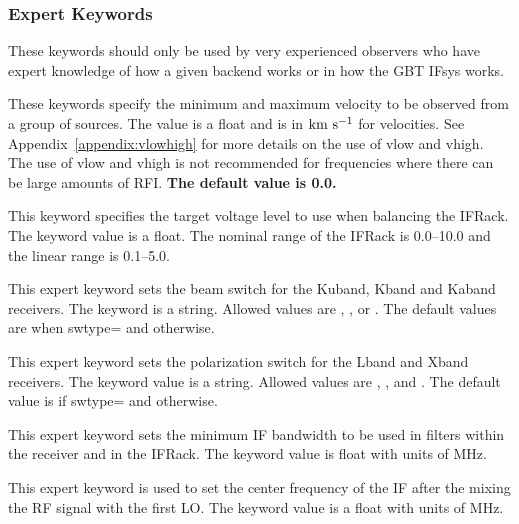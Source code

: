 \subsubsection{Expert Keywords}

These keywords should only be used by very experienced observers who
have expert knowledge of how a given backend works or in how the \gls{GBT}
\gls{IFsys} works.

\begin{description}[font=\bfseries\large,leftmargin=*]

\item[vlow \textnormal{and} vhigh] These keywords specify the minimum
and maximum velocity to be observed from a group of sources.  The value is a
float and is in ${\rm km~s^{-1}}$ for velocities. See
Appendix~\ref{appendix:vlowhigh} for more details on the use of vlow and
vhigh.  The use of vlow and vhigh is not recommended for frequencies where
there can be large amounts of \gls{RFI}. {\bf The default value is 0.0.}

\item[iftarget] This keyword specifies the target voltage level to use
when balancing the \gls{IFRack}.  The keyword value is a float.  The nominal
range of the \gls{IFRack} is 0.0--10.0 and the linear range is 0.1--5.0.


\item[xfer] This expert keyword sets the beam switch for the 
\gls{Kuband}, \gls{Kband} and \gls{Kaband} receivers.  The keyword is a string.
Allowed values are , , or .  The default values are
 when swtype= and  otherwise.

\item[polswitch]  This expert keyword sets the polarization switch
for the \gls{Lband} and \gls{Xband} receivers.  The keyword value is a string.
Allowed values are , , and .  The default value is
 if swtype= and  otherwise.

\item[ifbw] This expert keyword sets the minimum \gls{IF} bandwidth to be
used in filters within the receiver and in the \gls{IFRack}.  The keyword value
is float with units of MHz.

\item[if0freq] This expert keyword is used to set the center frequency
of the \gls{IF} after the mixing the \gls{RF} signal with the first
\gls{LO}.  The keyword value is a float with units of MHz.


\end{description}
